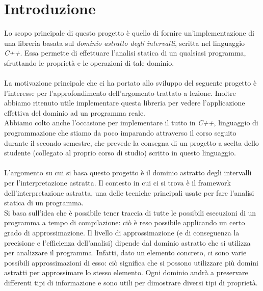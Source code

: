 \documentclass[a4paper, 10pt]{report}
\begin{document}
\begin{frontespizio}
	\Titoletto {}
	\Sottotitolo {}
\end{frontespizio}


\tableofcontents


\chapter*{Introduzione}
Lo scopo principale di questo progetto è quello di fornire un'implementazione di una libreria basata sul \textit{dominio astratto degli intervalli}, scritta nel linguaggio \textit{C++}. Essa permette di effettuare l'analisi statica di un qualsiasi programma, sfruttando le proprietà e le operazioni di tale dominio.\\
\\
La motivazione principale che ci ha portato allo sviluppo del seguente progetto è l'interesse per l'approfondimento dell'argomento trattato a lezione. Inoltre abbiamo ritenuto utile implementare questa libreria per vedere l'applicazione effettiva del dominio ad un programma reale.\\
Abbiamo colto anche l'occasione per implementare il tutto in \textit{C++}, linguaggio di programmazione che stiamo da poco imparando attraverso il corso seguito durante il secondo semestre, che prevede la consegna di un progetto a scelta dello studente (collegato al proprio corso di studio) scritto in questo linguaggio.\\
\\
L’argomento su cui si basa questo progetto è il dominio astratto degli intervalli per l’interpretazione astratta. Il contesto in cui ci si trova è il framework dell'interpretazione astratta, una delle tecniche principali usate per fare l’analisi statica di un programma.\\
Si basa sull'idea che è possibile tener traccia di tutte le possibili esecuzioni di un programma a tempo di compilazione: ciò è reso possibile applicando un certo grado di approssimazione. Il livello di approssimazione (e di conseguenza la precisione e l'efficienza dell'analisi) dipende dal dominio astratto che si utilizza per analizzare il programma. Infatti, dato un elemento concreto, ci sono varie possibili approssimazioni di esso: ciò significa che si possono utilizzare più domini astratti per approssimare lo stesso elemento. Ogni dominio andrà a preservare differenti tipi di informazione e sono utili per dimostrare diversi tipi di proprietà.\\
\end{document}
